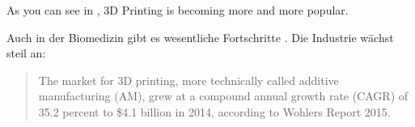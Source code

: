 \documentclass[11pt,a4paper]{article}
\begin{document}
As you can see in ,
3D Printing is becoming more and more popular.

Auch in der Biomedizin gibt es wesentliche Fortschritte \parencite[siehe][]{BABY,BIOMED}.
Die Industrie wächst steil an: \begin{quotation}
The market for 3D printing, more technically called additive manufacturing (AM), grew at a compound annual growth rate (CAGR) of 35.2 percent to  \$4.1 billion in 2014, according to Wohlers Report 2015. \emph{\cite{FORBES}}
\end{quotation}

\newpage

\printbibliography
\end{document}
